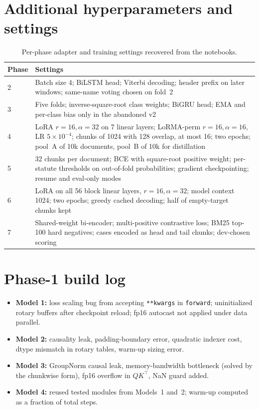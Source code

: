 \documentclass[11pt, oneside]{article}
\begin{document}
\section{Additional hyperparameters and settings}
\begin{table}[H]
\centering
\caption{Per-phase adapter and training settings recovered from the notebooks.}
\small
\begin{tabularx}{\linewidth}{lX}
\toprule
Phase & Settings \\
\midrule
2 & Batch size 4; BiLSTM head; Viterbi decoding; header prefix on later windows; same-name voting chosen on fold~2 \\
3 & Five folds; inverse-square-root class weights; BiGRU head; EMA and per-class bias only in the abandoned v2 \\
4 & LoRA $r=16,\alpha=32$ on 7 linear layers; LoRMA-perm $r=16,\alpha=16$, LR $5\times10^{-4}$; chunks of 1024 with 128 overlap, at most 16; two epochs; pool~A of 10k documents, pool~B of 10k for distillation \\
5 & 32 chunks per document; BCE with square-root positive weight; per-statute thresholds on out-of-fold probabilities; gradient checkpointing; resume and eval-only modes \\
6 & LoRA on all 56 block linear layers, $r=16,\alpha=32$; model context 1024; two epochs; greedy cached decoding; half of empty-target chunks kept \\
7 & Shared-weight bi-encoder; multi-positive contrastive loss; BM25 top-100 hard negatives; cases encoded as head and tail chunks; dev-chosen scoring \\
\bottomrule
\end{tabularx}
\end{table}

\section{Phase-1 build log}
\begin{itemize}[leftmargin=*,itemsep=0pt]
\item \textbf{Model 1:} loss scaling bug from accepting \texttt{**kwargs} in \texttt{forward}; uninitialized rotary buffers after checkpoint reload; fp16 autocast not applied under data parallel.
\item \textbf{Model 2:} causality leak, padding-boundary error, quadratic indexer cost, dtype mismatch in rotary tables, warm-up sizing error.
\item \textbf{Model 3:} GroupNorm causal leak, memory-bandwidth bottleneck (solved by the chunkwise form), fp16 overflow in $QK^\top$, NaN guard added.
\item \textbf{Model 4:} reused tested modules from Models~1 and~2; warm-up computed as a fraction of total steps.
\end{itemize}
\fi
\end{document}
